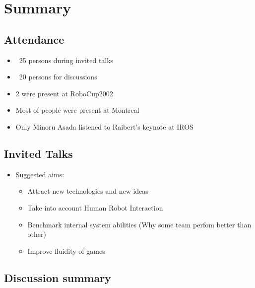 \documentclass{article}
\begin{document}
\section{Summary}
\subsection{Attendance}

\begin{itemize} 
   \item ~25 persons during invited talks
   \item ~20 persons for discussions
   \item 2 were present at RoboCup2002
   \item Most of people were present at Montreal
   \item Only Minoru Asada listened to Raibert's keynote at IROS
\end{itemize}
\subsection{Invited Talks}

\begin{itemize} 
   \item Suggested aims:
   \begin{itemize} 
       \item Attract new technologies and new ideas
       \item Take into account Human Robot Interaction
       \item Benchmark internal system abilities (Why some team perfom better than other)
       \item Improve fluidity of games
   \end{itemize}

\end{itemize}
\subsection{Discussion summary}
\end{document}
